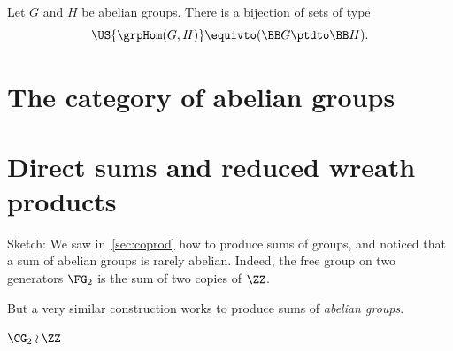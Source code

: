 
\begin{lemma}
  Let $G$ and $H$ be abelian groups. There is a bijection of sets of type
  \begin{displaymath}
    \US{\grpHom(G,H)} \equivto (\BB G \ptdto \BB H).
  \end{displaymath}
\end{lemma}

\section{The category of abelian groups}
\label{sec:ab-mon-closed-cat}

\section{Direct sums and reduced wreath products}
\label{sec:direct-sums}

Sketch:
We saw in~\cref{sec:coprod} how to produce sums of groups,
and noticed that a sum of abelian groups is rarely abelian.
Indeed, the free group on two generators $\FG_2$
is the sum of two copies of $\ZZ$.

But a very similar construction works to produce sums of \emph{abelian groups}.

\begin{example}
  $\CG_2 \mathbin{\wr} \ZZ$
\end{example}

